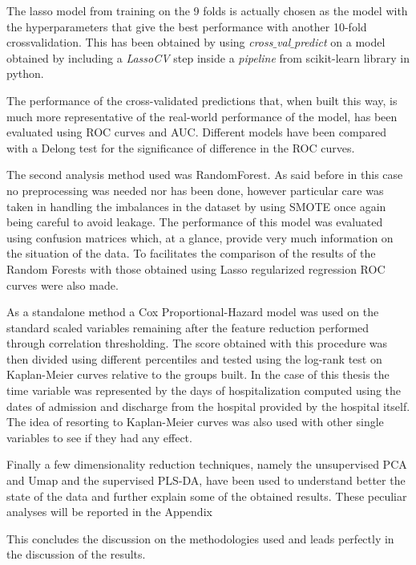 The lasso model from training on the 9 folds is actually chosen as the model with the hyperparameters that give the best performance with another 10-fold crossvalidation. This has been obtained by using \textit{cross$\_$val$\_$predict} on a model obtained by including a \textit{LassoCV} step inside a \textit{pipeline} from scikit-learn library in python. 

The performance of the cross-validated predictions that, when built this way, is much more representative of the real-world performance of the model, has been evaluated using ROC curves and AUC.
Different models have been compared with a Delong test\cite{Delong} for the significance of difference in the ROC curves.

The second analysis method used was RandomForest. As said before in this case no preprocessing was needed nor has been done, however particular care was taken in handling the imbalances in the dataset by using SMOTE \cite{SMOTE} once again being careful to avoid leakage. 
The performance of this model was evaluated using confusion matrices which, at a glance, provide very much information on the situation of the data.
To facilitates the comparison of the results of the Random Forests with those obtained using Lasso regularized regression ROC curves were also made.

As a standalone method a Cox Proportional-Hazard model was used on the standard scaled variables remaining after the feature reduction performed through correlation thresholding. 
The score obtained with this procedure was then divided using different percentiles and tested using the log-rank test on Kaplan-Meier curves relative to the groups built.
In the case of this thesis the time variable was represented by the days of hospitalization computed using the dates of admission and discharge from the hospital provided by the hospital itself.
The idea of resorting to Kaplan-Meier curves was also used with other single variables to see if they had any effect. 

Finally a few dimensionality reduction techniques, namely the unsupervised PCA\cite{PCA} and Umap \cite{UMAP} and the supervised PLS-DA\cite{PLSDA}, have been used to understand better the state of the data and further explain some of the obtained results.
These peculiar analyses will be reported in the Appendix 

This concludes the discussion on the methodologies used and leads perfectly in the discussion of the results.









